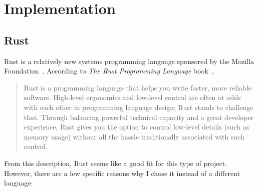 \section{Implementation} \label{implementation}

\subsection{Rust}

Rust is a relatively new systems programming language sponsored by the Mozilla Foundation~\cite{rust_website}. According to \emph{The Rust Programming Language} book~\cite{trpl},

\begin{quote}
Rust is a programming language that helps you write faster, more reliable software. High-level ergonomics and low-level control are often at odds with each other in programming language design; Rust stands to challenge that. Through balancing powerful technical capacity and a great developer experience, Rust gives you the option to control low-level details (such as memory usage) without all the hassle traditionally associated with such control.
\end{quote}

From this description, Rust seems like a good fit for this type of project. However, there are a few specific reasons why I chose it instead of a different language:

